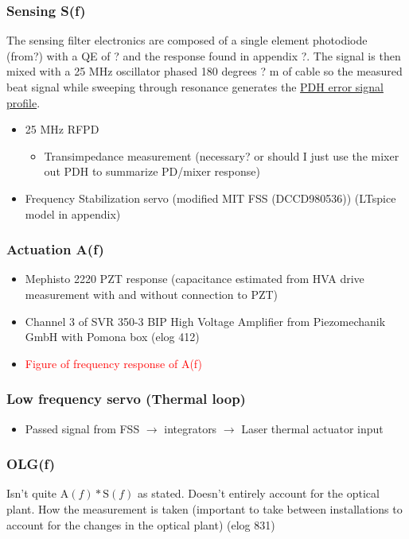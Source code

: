 \subsubsection{Sensing S(f)}
The sensing filter electronics are composed of a single element photodiode (from?) with a QE of ? and the response found in appendix ?. The signal is then mixed with a 25 MHz oscillator phased 180 degrees ? m of cable so the measured beat signal while sweeping through resonance generates the \hyperref[fig:pdh_error]{PDH error signal profile}.
\begin{itemize}
\item 25 MHz RFPD
\begin{itemize}
\item Transimpedance measurement (necessary? or should I just use the mixer out PDH to summarize PD/mixer response)
\end{itemize}
\item Frequency Stabilization servo (modified MIT FSS (DCCD980536)) (LTspice model in appendix)
\end{itemize}


\subsubsection{Actuation A(f)}
\begin{itemize}
\item Mephisto 2220 PZT response (capacitance estimated from HVA drive measurement with and without connection to PZT)
\item Channel 3 of SVR 350-3 BIP High Voltage Amplifier from Piezomechanik GmbH with Pomona box (elog 412)
\item \textcolor{red}{Figure of frequency response of A(f)}

\end{itemize}

\subsubsection{Low frequency servo (Thermal loop)}
\begin{itemize}
\item Passed signal from FSS $\rightarrow$ integrators $\rightarrow$ Laser thermal actuator input
\end{itemize}

\subsubsection{OLG(f)}
Isn't quite $\mathrm{A}(f)*\mathrm{S}(f)$ as stated. Doesn't entirely account for the optical plant.
How the measurement is taken (important to take between installations to account for the changes in the optical plant) (elog 831)

